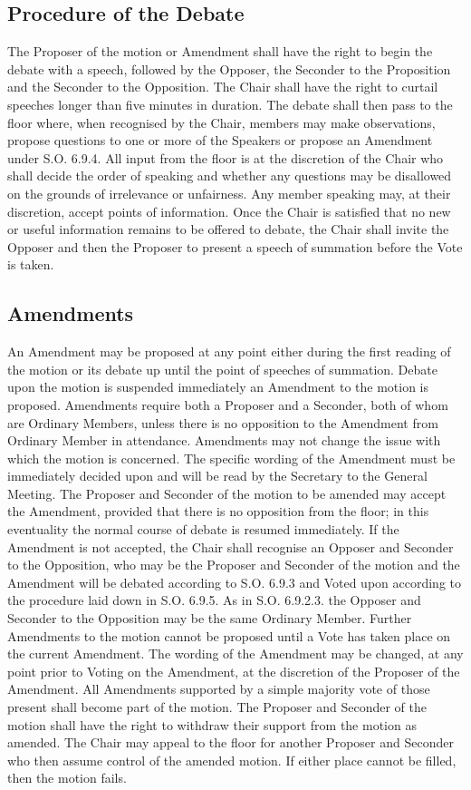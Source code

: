 \subsection{Procedure of the Debate}
\npara The Proposer of the motion or Amendment shall have the right to begin the debate with a speech, followed by the Opposer, the Seconder to the Proposition and the Seconder to the Opposition. The Chair shall have the right to curtail speeches longer than five minutes in duration.
\npara The debate shall then pass to the floor where, when recognised by the Chair, members may make observations, propose questions to one or more of the Speakers or propose an Amendment under S.O. 6.9.4.
\npara All input from the floor is at the discretion of the Chair who shall decide the order of speaking and whether any questions may be disallowed on the grounds of irrelevance or unfairness.
\npara Any member speaking may, at their discretion, accept points of information.
\npara Once the Chair is satisfied that no new or useful information remains to be offered to debate, the Chair shall invite the Opposer and then the Proposer to present a speech of summation before the Vote is taken.
\subsection{Amendments}
\npara An Amendment may be proposed at any point either during the first reading of the motion or its debate up until the point of speeches of summation.
\npara Debate upon the motion is suspended immediately an Amendment to the motion is proposed.
\npara Amendments require both a Proposer and a Seconder, both of whom are Ordinary Members, unless there is no opposition to the Amendment from Ordinary Member in attendance.
\npara Amendments may not change the issue with which the motion is concerned.
\npara The specific wording of the Amendment must be immediately decided upon and will be read by the Secretary to the General Meeting.
\npara The Proposer and Seconder of the motion to be amended may accept the Amendment, provided that there is no opposition from the floor; in this eventuality the normal course of debate is resumed immediately.
\npara If the Amendment is not accepted, the Chair shall recognise an Opposer and Seconder to the Opposition, who may be the Proposer and Seconder of the motion and the Amendment will be debated according to S.O. 6.9.3 and Voted upon according to the procedure laid down in S.O. 6.9.5.  As in S.O. 6.9.2.3. the Opposer and Seconder to the Opposition may be the same Ordinary Member.
\npara Further Amendments to the motion cannot be proposed until a Vote has taken place on the current Amendment.
\npara The wording of the Amendment may be changed, at any point prior to Voting on the Amendment, at the discretion of the Proposer of the Amendment.
\npara All Amendments supported by a simple majority vote of those present shall become part of the motion.
\npara The Proposer and Seconder of the motion shall have the right to withdraw their support from the motion as amended. The Chair may appeal to the floor for another Proposer and Seconder who then assume control of the amended motion.  If either place cannot be filled, then the motion fails.

